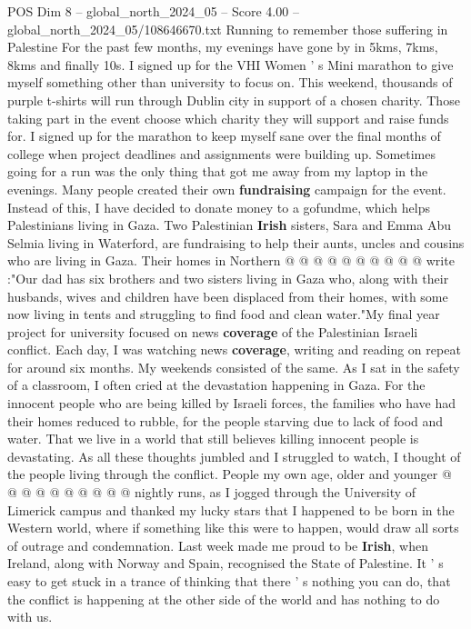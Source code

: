 \begin{textsample}{POS Dim 8 – global\_north\_2024\_05 – Score 4.00 – global\_north\_2024\_05/108646670.txt}  \label{ex:f8_pos_180}
Running to remember those suffering in Palestine For the past few months, my evenings have gone by in 5kms, 7kms, 8kms and finally 10s.
I signed up for the VHI Women ' s Mini marathon to give myself something other than university to focus on.
This weekend, thousands of purple t-shirts will run through Dublin city in support of a chosen charity.
Those taking part in the event choose which charity they will support and raise funds for.
I signed up for the marathon to keep myself sane over the final months of college when project deadlines and assignments were building up.
Sometimes going for a run was the only thing that got me away from my laptop in the evenings.
Many people created their own \textbf{fundraising} campaign for the event.
Instead of this, I have decided to donate money to a gofundme, which helps Palestinians living in Gaza.
Two Palestinian \textbf{Irish} sisters, Sara and Emma Abu Selmia living in Waterford, are fundraising to help their aunts, uncles and cousins who are living in Gaza.
Their homes in Northern @ @ @ @ @ @ @ @ @ @ write :"Our dad has six brothers and two sisters living in Gaza who, along with their husbands, wives and children have been displaced from their homes, with some now living in tents and struggling to find food and clean water."My final year project for university focused on news \textbf{coverage} of the Palestinian Israeli conflict.
Each day, I was watching news \textbf{coverage}, writing and reading on repeat for around six months.
My weekends consisted of the same.
As I sat in the safety of a classroom, I often cried at the devastation happening in Gaza.
For the innocent people who are being killed by Israeli forces, the families who have had their homes reduced to rubble, for the people starving due to lack of food and water.
That we live in a world that still believes killing innocent people is devastating.
As all these thoughts jumbled and I struggled to watch, I thought of the people living through the conflict.
People my own age, older and younger @ @ @ @ @ @ @ @ @ @ nightly runs, as I jogged through the University of Limerick campus and thanked my lucky stars that I happened to be born in the Western world, where if something like this were to happen, would draw all sorts of outrage and condemnation.
Last week made me proud to be \textbf{Irish}, when Ireland, along with Norway and Spain, recognised the State of Palestine.
It ' s easy to get stuck in a trance of thinking that there ' s nothing you can do, that the conflict is happening at the other side of the world and has nothing to do with us.

\end{textsample}
